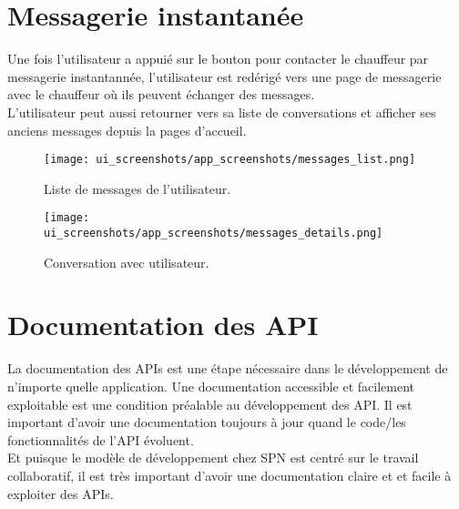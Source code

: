 \section{Messagerie instantanée}
Une fois l'utilisateur a appuié sur le bouton pour contacter le chauffeur par messagerie instantannée, l'utilisateur est redérigé vers une page de messagerie avec le chauffeur où ils peuvent échanger des messages.\\
\noindent L'utilisateur peut aussi retourner vers sa liste de conversations et afficher ses anciens messages depuis la pages d'accueil.
\clearpage
\begin{multicols}{2}
    \begin{figure}[H]
        \centering
        \texttt{[image: ui\_screenshots/app\_screenshots/messages\_list.png]}
        \vspace{1cm}
        \captionsetup{justification=centering}
        \caption{Liste de messages de l'utilisateur.}
        \label{fig:message_list}
    \end{figure}
    \begin{figure}[H]
        \centering
        \texttt{[image: ui\_screenshots/app\_screenshots/messages\_details.png]}
        \vspace{1cm}
        \captionsetup{justification=centering}
        \caption{Conversation avec utilisateur.}
        \label{fig:conversation}
    \end{figure}
\end{multicols}
\section{Documentation des API}
La documentation des APIs est une étape nécessaire dans le développement de n'importe quelle application. Une documentation accessible et facilement exploitable est une condition préalable au développement des API. Il est important d'avoir une documentation toujours à jour quand le code/les fonctionnalités de l'API évoluent.\\
\noindent Et puisque le modèle de développement chez SPN est centré sur le travail collaboratif, il est très important d'avoir une documentation claire et et facile à exploiter des APIs.

